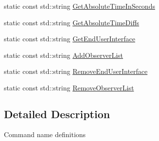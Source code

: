 \begin{DoxyCompactItemize}
\item 
static const std\-::string \hyperlink{classmts_manager_component_base_1_1_command_names_a35b8389a055af4cd8201da457ec4367b}{Get\-Absolute\-Time\-In\-Seconds}
\item 
static const std\-::string \hyperlink{classmts_manager_component_base_1_1_command_names_aa31a1e50a22f004b7a84d24572a7bf51}{Get\-Absolute\-Time\-Diffs}
\item 
static const std\-::string \hyperlink{classmts_manager_component_base_1_1_command_names_ab146a4659929f226e1ba7feddb5a6c0c}{Get\-End\-User\-Interface}
\item 
static const std\-::string \hyperlink{classmts_manager_component_base_1_1_command_names_a2f4a29c0b459f4c66df950d9139aa7ce}{Add\-Observer\-List}
\item 
static const std\-::string \hyperlink{classmts_manager_component_base_1_1_command_names_a741dd0ca8899fbd7caec506dba65359d}{Remove\-End\-User\-Interface}
\item 
static const std\-::string \hyperlink{classmts_manager_component_base_1_1_command_names_aea2b69069bf76d20bb93e0876f9f90da}{Remove\-Observer\-List}
\end{DoxyCompactItemize}


\subsection{Detailed Description}
Command name definitions 

